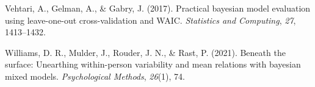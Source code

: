 \documentclass[
  jou,
  floatsintext,
  longtable,
  nolmodern,
  notxfonts,
  notimes,
  colorlinks=true,linkcolor=blue,citecolor=blue,urlcolor=blue]{apa7}
\newlength{\cslhangindent}
\newenvironment{CSLReferences}[2] %
 {\begin{list}{}{%
  \setlength{\itemindent}{0pt}
  \setlength{\leftmargin}{0pt}
  \setlength{\parsep}{0pt}
  \ifodd #1
   \setlength{\leftmargin}{\cslhangindent}
   \setlength{\itemindent}{-1\cslhangindent}
  \fi
  \setlength{\itemsep}{#2\baselineskip}}}
 {\end{list}}
\begin{document}
\begin{CSLReferences}{1}{0}
Vehtari, A., Gelman, A., \& Gabry, J. (2017). Practical bayesian model
evaluation using leave-one-out cross-validation and WAIC.
\emph{Statistics and Computing}, \emph{27}, 1413--1432.

Williams, D. R., Mulder, J., Rouder, J. N., \& Rast, P. (2021). Beneath
the surface: Unearthing within-person variability and mean relations
with bayesian mixed models. \emph{Psychological Methods}, \emph{26}(1),
74.

\end{CSLReferences}
\end{document}
